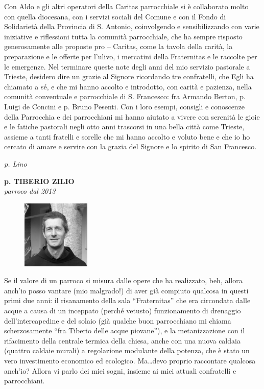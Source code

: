 Con Aldo e gli altri operatori della Caritas parrocchiale si è collaborato molto con quella diocesana, 
con i servizi sociali del Comune e con il Fondo di Solidarietà della Provincia di S. Antonio, 
coinvolgendo e sensibilizzando con varie iniziative e riflessioni tutta la comunità parrocchiale, che 
ha sempre risposto generosamente alle proposte pro – Caritas, come la tavola della carità, la 
preparazione e le offerte per l'ulivo, i mercatini della Fraternitas e le raccolte per le emergenze.
Nel  terminare queste note degli anni del mio servizio pastorale a Trieste, desidero dire un 
grazie al Signore ricordando tre confratelli, che Egli ha chiamato a sé, e che mi hanno accolto e 
introdotto, con carità e pazienza, nella comunità conventuale e parrocchiale di S. Francesco: fra 
Armando Berton, p. Luigi de Concini e p. Bruno Pesenti.
Con i loro esempi, consigli e conoscenze della Parrocchia e dei parrocchiani mi hanno aiutato a 
vivere con serenità le gioie e le fatiche pastorali negli otto anni trascorsi in una bella città come 
Trieste, assieme a tanti fratelli e sorelle che mi hanno accolto e voluto bene e che io ho cercato di 
amare e servire con la grazia del Signore e lo spirito di San Francesco. 
\begin{flushright}
\textit{p. Lino}
\end{flushright}
\endgroup
\newpage
\begin{center}
\textbf{\Large p. TIBERIO ZILIO}\\
	\textit{parroco dal 2013}
\end{center}
\bigbreak
\begingroup
\setlength\intextsep{0pt}
\begin{figure}
\centering
\includegraphics[width=0.29\textwidth]{immagini/tiberio.jpg}
\end{figure}
\noindent Se il valore di un parroco si misura dalle opere che ha realizzato, beh, allora anch’io posso
vantare (mio malgrado!) di aver già compiuto qualcosa in questi primi due anni: il risanamento 
della sala ``Fraternitas'' che era circondata dalle acque a causa di un inceppato (perché vetusto) 
funzionamento di drenaggio dell’intercapedine e del solaio (già qualche buon parrocchiano mi 
chiama scherzosamente ``fra Tiberio delle acque piovane''), e la metanizzazione con il rifacimento 
della centrale termica della chiesa, anche con una nuova caldaia (quattro caldaie murali) a 
regolazione modulante della potenza, che è stato un vero investimento economico ed ecologico. 
Ma…devo proprio raccontare qualcosa anch’io? Allora vi parlo dei miei sogni, insieme ai miei 
attuali confratelli e parrocchiani. 

